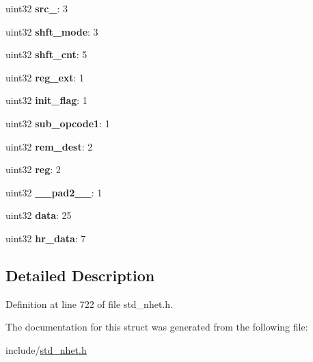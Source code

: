 \begin{DoxyCompactItemize}
\mbox{\label{structXOR__format_a8cd085409b82cda87e1fbe0fec64c950}} 
uint32 {\bfseries src\+\_}\+: 3
\item 
\mbox{\label{structXOR__format_a6f29640163141c3752f62c0794085cf9}} 
uint32 {\bfseries shft\+\_\+mode}\+: 3
\item 
\mbox{\label{structXOR__format_a82a653fdf55dd8baa35598829e05774c}} 
uint32 {\bfseries shft\+\_\+cnt}\+: 5
\item 
\mbox{\label{structXOR__format_a79022c41a1d2adf7a12d415e75efcc0e}} 
uint32 {\bfseries reg\+\_\+ext}\+: 1
\item 
\mbox{\label{structXOR__format_a59be5712095b6275e201f4481427e9d6}} 
uint32 {\bfseries init\+\_\+flag}\+: 1
\item 
\mbox{\label{structXOR__format_a9882df22895e8ccca0bc14846664bf01}} 
uint32 {\bfseries sub\+\_\+opcode1}\+: 1
\item 
\mbox{\label{structXOR__format_abeb9e770f6e0cc7586f5d46091bbc691}} 
uint32 {\bfseries rem\+\_\+dest}\+: 2
\item 
\mbox{\label{structXOR__format_af41c40178059eed8590d2f4c4b3f0907}} 
uint32 {\bfseries reg}\+: 2
\item 
\mbox{\label{structXOR__format_ad109094432ff6ac4c6f9556538322b25}} 
uint32 {\bfseries \+\_\+\+\_\+pad2\+\_\+\+\_\+}\+: 1
\item 
\mbox{\label{structXOR__format_a98aad61d80ed5494daa197afa57b11cb}} 
uint32 {\bfseries data}\+: 25
\item 
\mbox{\label{structXOR__format_a4dc791ecc6591a307a86021a11d0085c}} 
uint32 {\bfseries hr\+\_\+data}\+: 7
\end{DoxyCompactItemize}


\subsection{Detailed Description}


Definition at line 722 of file std\+\_\+nhet.\+h.



The documentation for this struct was generated from the following file\+:\begin{DoxyCompactItemize}
\item 
include/\mbox{\hyperlink{std__nhet_8h}{std\+\_\+nhet.\+h}}\end{DoxyCompactItemize}

